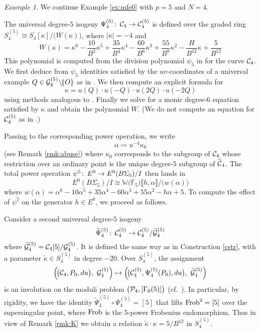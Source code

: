 \documentclass{gtpart}
\theoremstyle{definition}
\theoremstyle{remark}
\newtheorem{ex}[thm]{Example}
\def\co{\colon\thinspace}
\newcommand{\mb}[1]{\mathbb{#1}}
\newcommand{\cF}{\overline {\mb F}}
\newcommand{\CC}{{\cal C}}
\newcommand{\CG}{{\cal G}}
\newcommand{\CP}{{\cal P}}
\newcommand{\Frob}{{\rm Frob}}
\newcommand{\BW}{{\mb W}}
\newcommand{\HCC}{\widehat{~\!\!\CC}}
\newcommand{\A}{\alpha}
\newcommand{\G}{\Gamma}
\newcommand{\K}{\kappa}
\newcommand{\ce}{\coloneqq}
\newcommand{\lb}{\llbracket}
\newcommand{\rb}{\rrbracket}
\renewcommand{\=}{\approx}
\renewcommand{\-}{\sim}
\numberwithin{equation}{section}
\numberwithin{thm}{section}
\begin{document}
\begin{ex}
 \label{ex:po}
 We continue Example \ref{ex:mfe0} with $p = 5$ and $N = 4$.  

 The universal degree-$5$ isogeny $\Psi_4^{(5)} \co \CC_4 \to \CC_4^{(5)}$ is 
 defined over the graded ring $S_4^{(5)} \cong S_4[\K] / \big(W(\K)\big)$, where 
 $|\K| = -4$ and 
 \begin{equation}
  \label{W}
  W(\K) = \K^6 - \frac{10}{B^2} \K^5 + \frac{35}{B^4} \K^4 - \frac{60}{B^6} \K^3 
  + \frac{55}{B^8} \K^2 - \frac{H}{B^{12}} \K + \frac{5}{B^{12}} 
 \end{equation}
 This polynomial is computed from the division polynomial $\psi_5$ in 
 \cite[Exercise 3.7]{AEC} for the curve $\CC_4$.  We first deduce from $\psi_5$ 
 identities satisfied by the $uv$-coordinates of a universal example 
 $Q \in \CG_4^{(5)} \!\setminus\!\! \{O\}$ as in 
 \cite[proof of Proposition 2.2]{p3}.  We then compute an explicit formula for 
 \[
  \K = u(Q) \cdot u(-Q) \cdot u(2 Q) \cdot u(-2 Q) 
 \]
 using methods analogous to \cite[III.2.3]{AEC}.  Finally we solve for a monic 
 degree-6 equation satisfied by $\K$ and obtain the polynomial $W$.  (We do not 
 compute an equation for $\CC_4^{(5)}$ as in \cite[Proposition 2.3]{p3}.)  

 Passing to the corresponding power operation, we write 
 \begin{equation}
  \label{A}
  \A \ce u^{-4} \K_0 
 \end{equation}
 (see Remark \ref{rmk:abuse}) where $\K_0$ corresponds to the subgroup of 
 $\CC_4$ whose restriction over an ordinary point is the unique degree-$5$ 
 subgroup of $\HCC_4$.  The total power operation 
 $\psi^5 \co E^0 \to E^0(B\Sigma_5) / I$ then lands in 
 \[
  E^0(B\Sigma_5) / I \cong \BW \big( \cF_5 \big) \lb h, \A \rb / \big(w(\A)\big) 
 \]
 where $w(\A) = \A^6 - 10 \A^5 + 35 \A^4 - 60 \A^3 + 55 \A^2 - h \A + 5$.  To 
 compute the effect of $\psi^5$ on the generator $h \in E^0$, we proceed as 
 follows.  

 Consider a second universal degree-$5$ isogeny 
 \[
  \widetilde{\Psi}_4^{(5)} \co \CC_4^{(5)} \to 
  \CC_4^{(5)} / \widetilde{\CG}_4^{(5)} 
 \]
 where $\widetilde{\CG}_4^{(5)} = \CC_4[5] / \CG_4^{(5)}$.  It is defined the 
 same way as in Construction \ref{cstr}, with a parameter 
 $\widetilde{\K} \in S_4^{(5)}$ in degree $-20$.  Over $S_4^{(5)}$, the 
 assignment 
 \[
  \left(\! \big( \CC_4, P_0, du \big), ~ \CG_4^{(5)} \right) \mapsto 
  \left(\! \big( \CC_4^{(5)}, \Psi_4^{(5)}(P_0), du \big), 
  ~ \widetilde{\CG}_4^{(5)} \right) 
 \]
 is an involution on the moduli problem $\big(\CP_4,[\G_0(5)]\big)$ 
 (cf.~\cite[11.3.1]{KM}).  In particular, by rigidity, we have the identity 
 $\widetilde{\Psi}_4^{(5)} \circ \Psi_4^{(5)} = [5]$ that lifts $\Frob^2 = [5]$ 
 over the supersingular point, where $\Frob$ is the 5-power Frobenius 
 endomorphism.  Thus in view of Remark \ref{rmk:K} we obtain a relation 
 $\widetilde{\K} \cdot \K = 5 / B^{12}$ in $S_4^{(5)}$.  


\end{ex}
\end{document}
